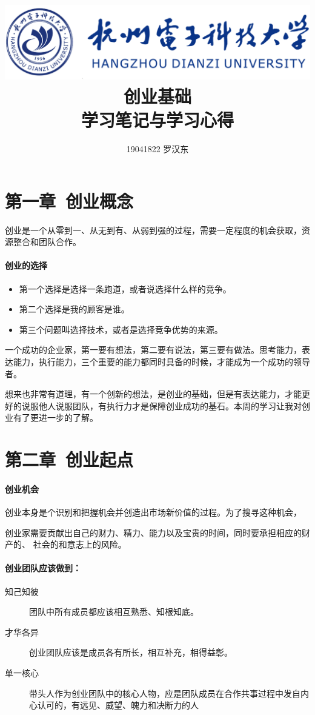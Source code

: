 \documentclass[UTF8]{article}
\author{19041822 罗汉东}
\title{
	\includegraphics[scale = 1.0]{HDU.png}\\
    \vspace{1in}
    \textmd{ \Huge\textbf{创业基础}}\\
    \textmd{\textbf{学习笔记与学习心得}}\\
   	\vspace{4.5in}
}
\begin{document}
\maketitle
\newpage
\tableofcontents
\newpage
\section{第一章\ 创业概念}
创业是一个从零到一、从无到有、从弱到强的过程，需要一定程度的机会获取，资源整合和团队合作。
\paragraph{创业的选择}
\begin{itemize}
    \item 第一个选择是选择一条跑道，或者说选择什么样的竞争。
    \item 第二个选择是我的顾客是谁。
    \item 第三个问题叫选择技术，或者是选择竞争优势的来源。
\end{itemize}
一个成功的企业家，第一要有想法，第二要有说法，第三要有做法。思考能力，表达能力，执行能力，三个重要的能力都同时具备的时候，才能成为一个成功的领导者。


想来也非常有道理，有一个创新的想法，是创业的基础，但是有表达能力，才能更好的说服他人说服团队，有执行力才是保障创业成功的基石。本周的学习让我对创业有了更进一步的了解。


\section{第二章\ 创业起点}
\paragraph{创业机会}
创业本身是个识别和把握机会并创造出市场新价值的过程。为了搜寻这种机会，

创业家需要贡献出自己的财力、精力、能力以及宝贵的时间，同时要承担相应的财产的、
社会的和意志上的风险。
\paragraph{创业团队应该做到：}
\begin{description}
    \item[知己知彼]团队中所有成员都应该相互熟悉、知根知底。
    \item[才华各异]创业团队应该是成员各有所长，相互补充，相得益彰。
    \item[单一核心]带头人作为创业团队中的核心人物，应是团队成员在合作共事过程中发自内心认可的，有远见、威望、魄力和决断力的人
\end{description}
\end{document}
